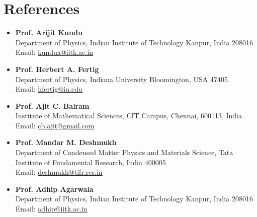 \documentclass[a4paper,11pt]{article}
\begin{document}
\section*{References}
\begin{itemize}
	\item 
	\textbf{Prof. Arijit Kundu} \\
	Department of Physics, Indian Institute of Technology Kanpur, India 208016 \\
	Email: \href{mailto:kundua@iitk.ac.in}{kundua@iitk.ac.in}

	\item
	\textbf{Prof. Herbert A. Fertig}\\
	Department of Physics, Indiana University Bloomington, USA 47405\\
	Email: \href{mailto:hfertig@iu.edu}{hfertig@iu.edu}

	\item
	\textbf{Prof. Ajit C. Balram}\\
	Institute of Mathematical Sciences, CIT Campus, Chennai, 600113, India\\
	Email: \href{mailto:cb.ajit@gmail.com}{cb.ajit@gmail.com}

	\item
	\textbf{Prof. Mandar M. Deshmukh}\\
	Department of Condensed Matter Physics and Materials Science, Tata Institute of Fundamental Research, India 400005\\
	Email: \href{mailto:deshmukh@tifr.res.in}{deshmukh@tifr.res.in}

	\item 
	\textbf{Prof. Adhip Agarwala} \\
	Department of Physics, Indian Institute of Technology Kanpur, India 208016 \\
	Email: \href{mailto:adhip@iitk.ac.in}{adhip@iitk.ac.in}
\end{itemize}
\end{document}
